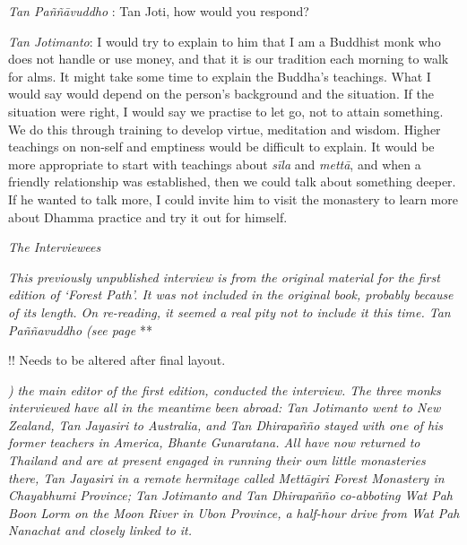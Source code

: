\emph{Tan Paññāvuddho} : Tan Joti, how would you respond?

\emph{Tan Jotimanto}: I would try to explain to him that I am a Buddhist
monk who does not handle or use money, and that it is our tradition each
morning to walk for alms. It might take some time to explain the
Buddha's teachings. What I would say would depend on the person's
background and the situation. If the situation were right, I would say
we practise to let go, not to attain something. We do this through
training to develop virtue, meditation and wisdom. Higher teachings on
non-self and emptiness would be difficult to explain. It would be more
appropriate to start with teachings about \emph{sīla} and \emph{mettā},
and when a friendly relationship was established, then we could talk
about something deeper. If he wanted to talk more, I could invite him to
visit the monastery to learn more about Dhamma practice and try it out
for himself.

\emph{The Interviewees}

\emph{This previously unpublished interview is from the original
material for the first edition of `Forest Path'. It was not included in
the original book, probably because of its length. On re-reading, it
seemed a real pity not to include it this time. Tan Paññavuddho (see
page} **

!! Needs to be altered after final layout.

\emph{)} \emph{the main editor of the first edition, conducted the
interview. The three monks interviewed have all in the meantime been
abroad: Tan Jotimanto went to New Zealand, Tan Jayasiri to Australia,
and Tan Dhirapañño stayed with one of his former teachers in America,
Bhante Gunaratana. All have now returned to Thailand and are at present
engaged in running their own little monasteries there, Tan Jayasiri in a
remote hermitage called Mettāgiri Forest Monastery in Chayabhumi
Province; Tan Jotimanto and Tan Dhirapañño co-abboting Wat Pah Boon Lorm
on the Moon River in Ubon Province, a half-hour drive from Wat Pah
Nanachat and closely linked to it.}

